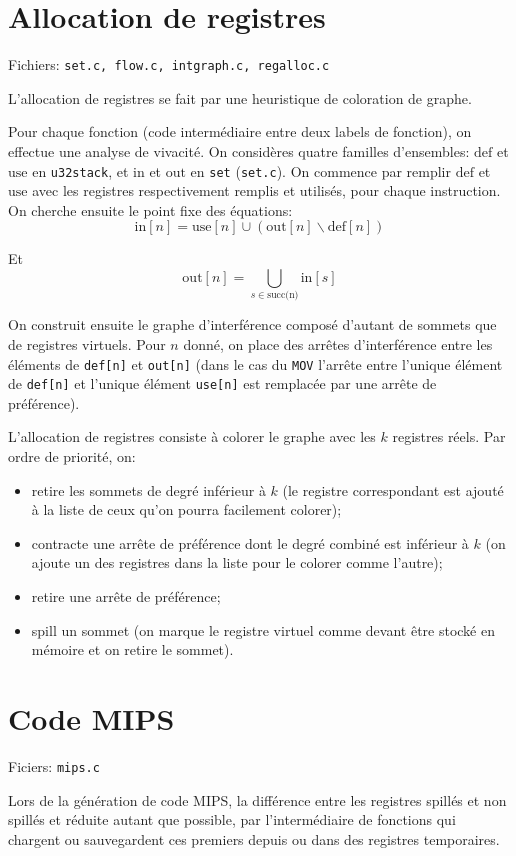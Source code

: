 \documentclass{article}
\begin{document}
	\section{Allocation de registres}
		\par Fichiers: \verb#set.c, flow.c, intgraph.c, regalloc.c#
		\par L'allocation de registres se fait par une heuristique de coloration de graphe.
		\par Pour chaque fonction (code intermédiaire entre deux labels de fonction), on effectue une analyse de vivacité. On considères quatre familles d'ensembles: $\text{def}$ et $\text{use}$ en \verb#u32stack#, et $\text{in}$ et $\text{out}$ en \verb#set# (\verb#set.c#). On commence par remplir $\text{def}$ et $\text{use}$ avec les registres respectivement remplis et utilisés, pour chaque instruction. On cherche ensuite le point fixe des équations:
		\[
			\text{in}[n] = \text{use}[n] \cup (\text{out}[n] \backslash \text{def}[n])
		\]
		\par Et
		\[
			\text{out}[n] = \bigcup_{s \in \text{succ(n)}} \text{in}[s]
		\]
		\par On construit ensuite le graphe d'interférence composé d'autant de sommets que de registres virtuels. Pour $n$ donné, on place des arrêtes d'interférence entre les éléments de \verb#def[n]# et \verb#out[n]# (dans le cas du \verb#MOV# l'arrête entre l'unique élément de \verb#def[n]# et l'unique élément \verb#use[n]# est remplacée par une arrête de préférence).
		\par L'allocation de registres consiste à colorer le graphe avec les $k$ registres réels. Par ordre de priorité, on:
		\begin{itemize}
			\item retire les sommets de degré inférieur à $k$ (le registre correspondant est ajouté à la liste de ceux qu'on pourra facilement colorer);
			\item contracte une arrête de préférence dont le degré combiné est inférieur à $k$ (on ajoute un des registres dans la liste pour le colorer comme l'autre);
			\item retire une arrête de préférence;
			\item spill un sommet (on marque le registre virtuel comme devant être stocké en mémoire et on retire le sommet).
		\end{itemize}
	\section{Code MIPS}
		\par Ficiers: \verb#mips.c#
		\par Lors de la génération de code MIPS, la différence entre les registres spillés et non spillés et réduite autant que possible, par l'intermédiaire de fonctions qui chargent ou sauvegardent ces premiers depuis ou dans des registres temporaires.
\end{document}
